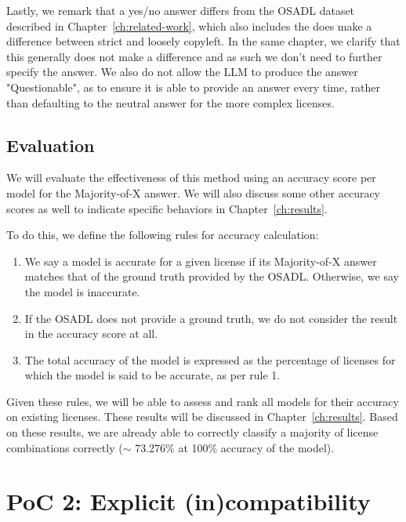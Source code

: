 Lastly, we remark that a yes/no answer differs from the OSADL dataset described in Chapter~\ref{ch:related-work}, which also includes the does make a difference between strict and loosely copyleft. In the same chapter, we clarify that this generally does not make a difference and as such we don't need to further specify the answer. We also do not allow the LLM to produce the answer "Questionable", as to ensure it is able to provide an answer every time, rather than defaulting to the neutral answer for the more complex licenses.

\subsection{Evaluation}

We will evaluate the effectiveness of this method using an accuracy score per model for the Majority-of-X answer. We will also discuss some other accuracy scores as well to indicate specific behaviors in Chapter~\ref{ch:results}.

To do this, we define the following rules for accuracy calculation:

\begin{enumerate}
	\item We say a model is accurate for a given license if its Majority-of-X answer matches that of the ground truth provided by the OSADL. Otherwise, we say the model is inaccurate.
	\item If the OSADL does not provide a ground truth, we do not consider the result in the accuracy score at all.
	\item The total accuracy of the model is expressed as the percentage of licenses for which the model is said to be accurate, as per rule 1.
\end{enumerate}

Given these rules, we will be able to assess and rank all models for their accuracy on existing licenses. These results will be discussed in Chapter~\ref{ch:results}. Based on these results, we are already able to correctly classify a majority of license combinations correctly ($\sim$ 73.276\% at 100\% accuracy of the model). \\

\section{PoC 2: Explicit (in)compatibility}